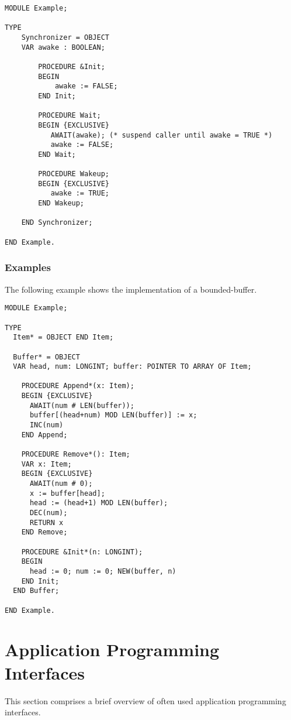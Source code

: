 \documentclass[a4paper,11pt]{article}
\begin{document}
\begin{lstlisting}[language=Oberon,frame=none,caption=Example of object synchronization]
MODULE Example;

TYPE
    Synchronizer = OBJECT
    VAR awake : BOOLEAN;

        PROCEDURE &Init;
        BEGIN
            awake := FALSE;
        END Init;

        PROCEDURE Wait;
        BEGIN {EXCLUSIVE}
           AWAIT(awake); (* suspend caller until awake = TRUE *)
           awake := FALSE;
        END Wait;

        PROCEDURE Wakeup;
        BEGIN {EXCLUSIVE}
           awake := TRUE;
        END Wakeup;

    END Synchronizer;

END Example.
\end{lstlisting}

\subsubsection{Examples}
The following example shows the implementation of a bounded-buffer.

\begin{lstlisting}[language=Oberon,frame=none,caption={Bounded-buffer}]
MODULE Example;

TYPE
  Item* = OBJECT END Item;

  Buffer* = OBJECT
  VAR head, num: LONGINT; buffer: POINTER TO ARRAY OF Item;

    PROCEDURE Append*(x: Item);
    BEGIN {EXCLUSIVE}
      AWAIT(num # LEN(buffer));
      buffer[(head+num) MOD LEN(buffer)] := x;
      INC(num)
    END Append;

    PROCEDURE Remove*(): Item;
    VAR x: Item;
    BEGIN {EXCLUSIVE}
      AWAIT(num # 0);
      x := buffer[head];
      head := (head+1) MOD LEN(buffer);
      DEC(num);
      RETURN x
    END Remove;

    PROCEDURE &Init*(n: LONGINT);
    BEGIN
      head := 0; num := 0; NEW(buffer, n)
    END Init;
  END Buffer;

END Example.
\end{lstlisting}

\section{Application Programming Interfaces}
This section comprises a brief overview of often used application programming interfaces.
\end{document}
